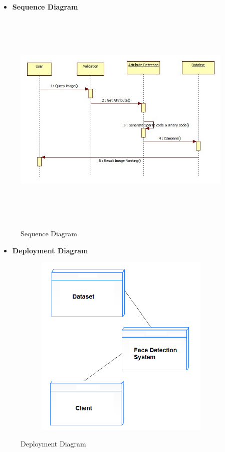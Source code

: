 \begin{itemize}
\item \textbf {Sequence Diagram}
\end{itemize}

\begin{figure}[ht!]
	\centering
\includegraphics[height=300pt,width=300pt]{Seq.png}\\
\caption{Sequence Diagram}
\end{figure}



\begin{itemize}
\item \textbf {Deployment Diagram}
\end{itemize}

\begin{figure}[ht!]
	\centering
\includegraphics[height=250pt,width=300pt]{dep.png}\\
\caption{Deployment Diagram}
\end{figure}




